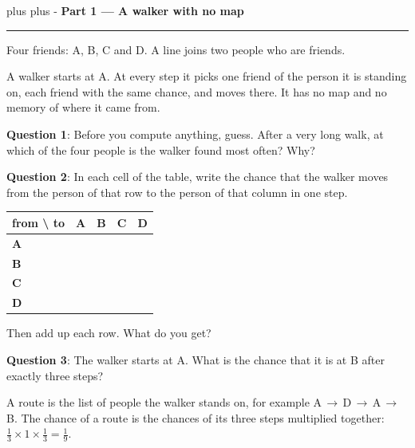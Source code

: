 \documentclass[a4paper, 14pt]{extarticle}
\newcommand{\needroom}[1]{%
  \par
  \begingroup
    \setlength{\dimen0}{#1}%
    \vskip 0pt plus \dimen0
    \penalty -100%
    \vskip 0pt plus -\dimen0
  \endgroup}
\newcommand{\parthead}[2]{%
  \needroom{6\baselineskip}%
  \partheadhere{#1}{#2}}
\newcommand{\partheadhere}[2]{%
  \vspace{0.5em}
  {\large\bfseries Part #1 --- #2}\par
  \vspace{-0.4em}\rule{\textwidth}{0.8pt}\par
  \vspace{0.1em}}
\begin{document}
\parthead{1}{A walker with no map}

\begin{minipage}[c]{0.5\textwidth}
\setlength{\parskip}{0.38em}
Four friends: A, B, C and D. A line joins two people who are friends.

A walker starts at A. At every step it picks one friend of the person it is
standing on, each friend with the same chance, and moves there. It has no map
and no memory of where it came from.
\end{minipage}
\hfill
\begin{minipage}[c]{0.46\textwidth}
\begin{center}
\resizebox{0.95\textwidth}{!}{\fournet{}}
\end{center}
\end{minipage}

\vspace{0.4em}

{\bf Question 1}: Before you compute anything, guess. After a very long walk,
at which of the four people is the walker found most often? Why?

{\bf Question 2}: In each cell of the table, write the chance that the walker
moves from the person of that row to the person of that column in one step.

\begin{center}
{\setlength{\tabcolsep}{6pt}
\begin{tabular}{|C{2.4cm}|C{1.7cm}|C{1.7cm}|C{1.7cm}|C{1.7cm}|}
\hline
\small from \textbackslash{} to & \bfseries A & \bfseries B & \bfseries C & \bfseries D \\
\hline
\bfseries A & & & & \\[0.3cm] \hline
\bfseries B & & & & \\[0.3cm] \hline
\bfseries C & & & & \\[0.3cm] \hline
\bfseries D & & & & \\[0.3cm] \hline
\end{tabular}}
\end{center}

Then add up each row. What do you get?

{\bf Question 3}: The walker starts at A. What is the chance that it is at B
after exactly three steps?

A route is the list of people the walker stands on, for example
A\,$\to$\,D\,$\to$\,A\,$\to$\,B. The chance of a route is the chances of its
three steps multiplied together: $\frac13 \times 1 \times \frac13 = \frac19$.
\end{document}
